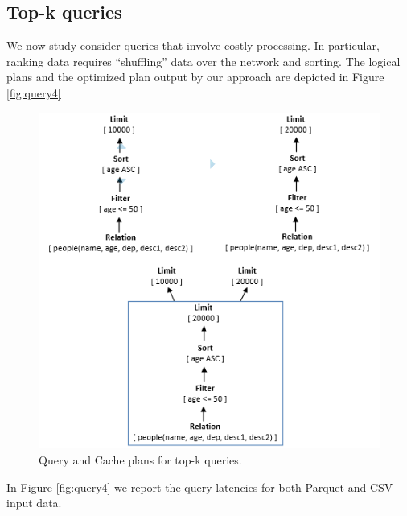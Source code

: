 \subsection{Top-k queries}
We now study consider queries that involve costly processing. In particular, ranking data requires ``shuffling'' data over the network and sorting. The logical plans and the optimized plan output by our approach are depicted in Figure \ref{fig:query4}

\begin{figure}[ht]
   \centering
   \includegraphics[scale=0.5]{figures/query4_cacheplan}
   \caption{Query and Cache plans for top-k queries.} 
   \label{fig:query4_plans}
\end{figure}

In Figure \ref{fig:query4} we report the query latencies for both Parquet and CSV input data.

